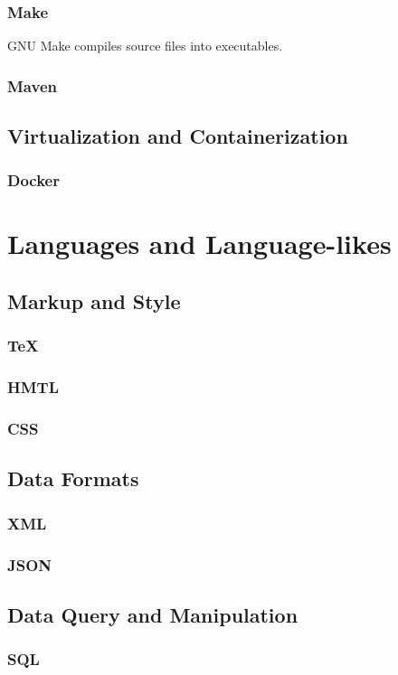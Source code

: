 \subsubsection{Make}

GNU Make compiles source files into executables.

\subsubsection{Maven}

\subsection{Virtualization and Containerization}

\subsubsection{Docker}

\section{Languages and Language-likes}

\subsection{Markup and Style}

\subsubsection{TeX}

\subsubsection{HMTL}

\subsubsection{CSS}

\subsection{Data Formats}

\subsubsection{XML}

\subsubsection{JSON}

\subsection{Data Query and Manipulation}

\subsubsection{SQL}

